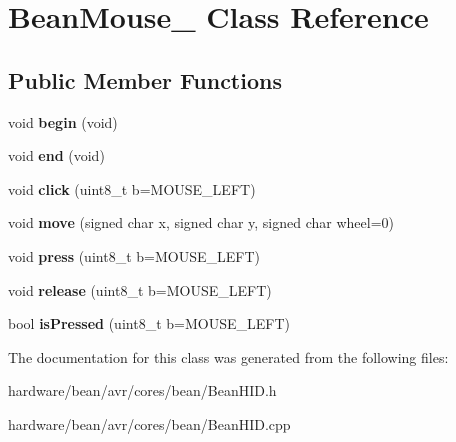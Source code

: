 \hypertarget{class_bean_mouse__}{}\section{Bean\+Mouse\+\_\+ Class Reference}
\label{class_bean_mouse__}
\subsection*{Public Member Functions}
\begin{DoxyCompactItemize}
\item 
\hypertarget{class_bean_mouse___a0c9b770b6f851178591e445b2a994647}{}void {\bfseries begin} (void)\label{class_bean_mouse___a0c9b770b6f851178591e445b2a994647}

\item 
\hypertarget{class_bean_mouse___a498d4061a98286473c35d95881f8cf0d}{}void {\bfseries end} (void)\label{class_bean_mouse___a498d4061a98286473c35d95881f8cf0d}

\item 
\hypertarget{class_bean_mouse___a72c644c46ad7c9206d7c045ebf292cb2}{}void {\bfseries click} (uint8\+\_\+t b=M\+O\+U\+S\+E\+\_\+\+L\+E\+F\+T)\label{class_bean_mouse___a72c644c46ad7c9206d7c045ebf292cb2}

\item 
\hypertarget{class_bean_mouse___ae84b11725782e08eedafba6c534d7f77}{}void {\bfseries move} (signed char x, signed char y, signed char wheel=0)\label{class_bean_mouse___ae84b11725782e08eedafba6c534d7f77}

\item 
\hypertarget{class_bean_mouse___a8313dd4e33a013925c682790324e8f4a}{}void {\bfseries press} (uint8\+\_\+t b=M\+O\+U\+S\+E\+\_\+\+L\+E\+F\+T)\label{class_bean_mouse___a8313dd4e33a013925c682790324e8f4a}

\item 
\hypertarget{class_bean_mouse___ae7861ba78b980272c16eb2e2702ef5b8}{}void {\bfseries release} (uint8\+\_\+t b=M\+O\+U\+S\+E\+\_\+\+L\+E\+F\+T)\label{class_bean_mouse___ae7861ba78b980272c16eb2e2702ef5b8}

\item 
\hypertarget{class_bean_mouse___a8b9e8a6d898c602416c818c02bde67e4}{}bool {\bfseries is\+Pressed} (uint8\+\_\+t b=M\+O\+U\+S\+E\+\_\+\+L\+E\+F\+T)\label{class_bean_mouse___a8b9e8a6d898c602416c818c02bde67e4}

\end{DoxyCompactItemize}


The documentation for this class was generated from the following files\+:\begin{DoxyCompactItemize}
\item 
hardware/bean/avr/cores/bean/Bean\+H\+I\+D.\+h\item 
hardware/bean/avr/cores/bean/Bean\+H\+I\+D.\+cpp\end{DoxyCompactItemize}
